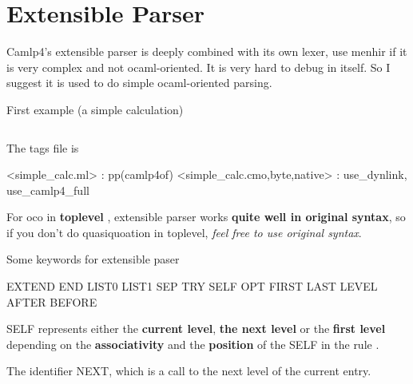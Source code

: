 \section{Extensible Parser}

Camlp4's extensible parser is deeply combined with its own lexer, use
menhir if it is very complex and not ocaml-oriented. It is very hard
to debug in itself. So I suggest it is used to do simple
ocaml-oriented parsing.


First example (a simple calculation)


\inputminted{ocaml}{code/camlp4/simple_calc.ml}


The tags file is 
\begin{bluetext}
<simple_calc.ml> : pp(camlp4of)
<simple_calc.{cmo,byte,native}> : use_dynlink, use_camlp4_full
\end{bluetext}


For oco in \textbf{ toplevel }, extensible parser works \textbf{ quite
  well in original syntax}, so if you don't do quasiquoation in
toplevel, \textit{feel free to use original syntax}.  

Some keywords for extensible paser


  \begin{bluecode}
    EXTEND END  LIST0 LIST1 SEP TRY SELF OPT  FIRST LAST  LEVEL AFTER BEFORE
  \end{bluecode}

SELF represents either the \textbf{current level}, \textbf{the next
  level} or the \textbf{ first level} depending on the \textbf{
  associativity} and the \textbf{position} of the SELF in the rule .

The identifier NEXT, which is a call to the next level of the current
entry.


